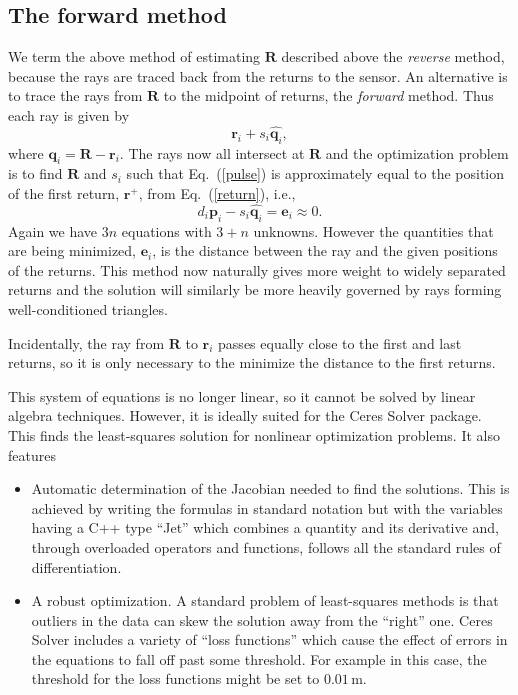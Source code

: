 \documentclass
[rmp,reprint,
twocolumn,amsmath,showkeys,letterpaper,raggedbottom]{revtex4-2}
\begin{document}
\subsection{The forward method}

We term the above method of estimating $\mathbf R$ described above the
{\it reverse} method, because the rays are traced back from the returns
to the sensor.  An alternative is to trace the rays from $\mathbf R$ to
the midpoint of returns, the {\it forward} method.  Thus each ray is
given by
\begin{equation} \label{pulse}
 \mathbf r_i + s_i \hat{\mathbf q_i},
\end{equation}
where $\mathbf q_i = \mathbf R - \mathbf r_i$.  The rays now all
intersect at $\mathbf R$ and the optimization problem is to find
$\mathbf R$ and $s_i$ such that Eq.~(\ref{pulse}) is approximately equal
to the position of the first return, $\mathbf r^+$, from
Eq.~(\ref{return}), i.e.,
\begin{equation}
  d_i \mathbf p_i - s_i \hat{\mathbf q_i} = \mathbf e_i \approx 0.
\end{equation}
Again we have $3n$ equations with $3 + n$ unknowns.  However the
quantities that are being minimized, $\mathbf e_i$, is the distance
between the ray and the given positions of the returns.  This method
now naturally gives more weight to widely separated returns and the
solution will similarly be more heavily governed by rays forming
well-conditioned triangles.

Incidentally, the ray from $\mathbf R$ to $\mathbf r_i$ passes equally
close to the first and last returns, so it is only necessary to the
minimize the distance to the first returns.

This system of equations is no longer linear, so it cannot be solved by
linear algebra techniques.  However, it is ideally suited for the Ceres
Solver package.  This finds the least-squares solution for nonlinear
optimization problems.  It also features
\begin{itemize}
\item
  Automatic determination of the Jacobian needed to find the solutions.
  This is achieved by writing the formulas in standard notation but with
  the variables having a C++ type ``Jet'' which combines a quantity and
  its derivative and, through overloaded operators and functions,
  follows all the standard rules of differentiation.
\item
  A robust optimization.  A standard problem of least-squares methods is
  that outliers in the data can skew the solution away from the
  ``right'' one.  Ceres Solver includes a variety of ``loss functions''
  which cause the effect of errors in the equations to fall off past
  some threshold.  For example in this case, the threshold for the loss
  functions might be set to $0.01\,\text{m}$.
\end{itemize}
\end{document}
